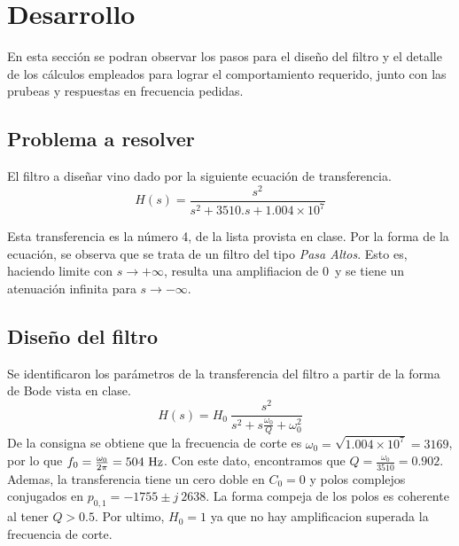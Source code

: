 \section*{Desarrollo}
En esta secci\'on se podran observar los pasos para el diseño del filtro y el detalle de los c\'alculos empleados para lograr el comportamiento requerido, junto con las prubeas y respuestas en frecuencia pedidas.\\


\subsection*{Problema a resolver}
El filtro a diseñar vino dado por la siguiente ecuaci\'on de transferencia. \\
\begin{equation}
	H(s)=\frac{s^2}{s^2+3510 . s+1.004\times10^7}	
\end{equation}


Esta transferencia es la n\'umero 4, de la lista provista en clase.
Por la forma de la ecuaci\'on, se observa que se trata de un filtro del tipo \textit{Pasa Altos}. Esto es, haciendo limite con $s \rightarrow +\infty$, resulta una amplifiacion de 0\dB \ y se tiene un atenuaci\'on infinita para $s\rightarrow-\infty$.

\subsection*{Diseño del filtro}
Se identificaron los par\'ametros de la transferencia del filtro a partir de la forma de Bode vista en clase.\\

\begin{equation}
  H(s)=H_0\ \frac{s^2}{s^2 +s \frac{\omega_0}{Q} +\omega_0^2}
\end{equation}
De la consigna se obtiene que la frecuencia de corte es 
$\omega_0=\sqrt{1.004\times10^7}=3169$, por lo que $f_0=\frac{\omega_0}{2\pi}=504\ \si{\hertz}$. Con este dato, encontramos que $Q=\frac{\omega_0}{3510}=0.902$.\\
Ademas, la transferencia tiene un cero doble en $C_0=0$ y polos complejos conjugados en $p_{0,1}= -1755\pm j\ 2638 $. La forma compeja de los polos es coherente al tener $Q>0.5$.
Por ultimo, $H_0 =1$  ya que no hay amplificacion superada la frecuencia de corte.\\


